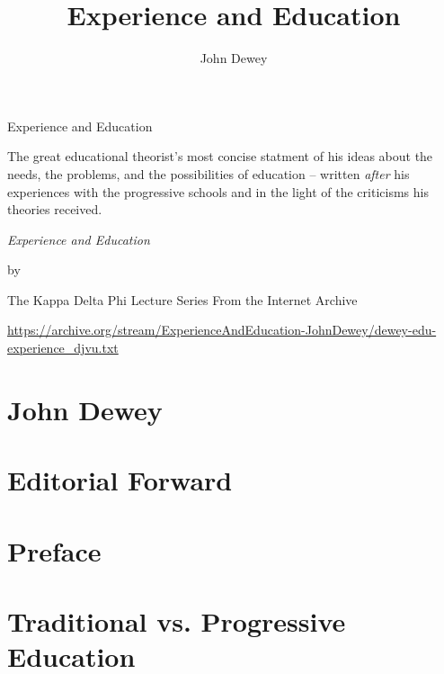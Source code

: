\documentclass[fontsize=12pt,a5paper,BCOR=12mm,DIV=calc,twoside]{scrbook}
\title{Experience and Education}
\author{John Dewey}
\date{}
\begin{document}
\frontmatter
\makeatletter
\begin{titlepage}
	\setlength{\parindent}{0pt}
	\vspace*{.15\textheight}
	{\LARGE \sffamily \scshape \@author\par}
	\medbreak
	{\Huge \sffamily Experience and Education\par}
	\medbreak
	{\small The great educational theorist's most concise statment of his ideas about the needs, the problems, and the possibilities of education -- written \textit{after} his experiences with the progressive schools and in the light of the criticisms his theories received.\par}
\end{titlepage}
\makeatother


\makeatletter
\begin{titlepage}
	\setlength{\parindent}{0pt}
	\vspace*{.15\textheight}
	\bigbreak
	{\Huge \slshape	 Experience and Education\par}
	\medbreak
	{\Large by \scshape \@author\par}
	\bigbreak
	{The Kappa Delta Phi Lecture Series}
        \vfill
        {\small From the Internet Archive}\par
        {\tiny \url{https://archive.org/stream/ExperienceAndEducation-JohnDewey/dewey-edu-experience_djvu.txt}}
\end{titlepage}
\makeatother

\chapter*{John Dewey}


\chapter*{Editorial Forward}


\chapter*{Preface}


\tableofcontents
\mainmatter


\chapter{Traditional vs. Progressive Education}

\end{document}
